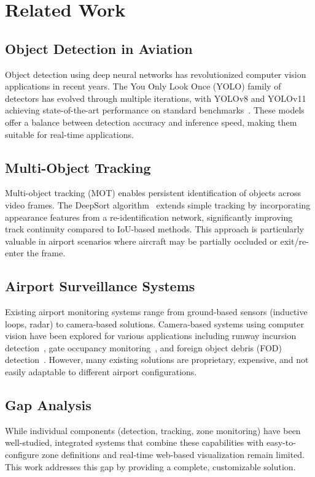 \documentclass[conference]{IEEEtran}
\begin{document}
\section{Related Work}
\label{sec:related_work}

\subsection{Object Detection in Aviation}
Object detection using deep neural networks has revolutionized computer vision applications in recent years. The You Only Look Once (YOLO) family of detectors has evolved through multiple iterations, with YOLOv8 and YOLOv11 achieving state-of-the-art performance on standard benchmarks~\cite{redmon2016yolo, ultralytics}. These models offer a balance between detection accuracy and inference speed, making them suitable for real-time applications.

\subsection{Multi-Object Tracking}
Multi-object tracking (MOT) enables persistent identification of objects across video frames. The DeepSort algorithm~\cite{wojke2017simple} extends simple tracking by incorporating appearance features from a re-identification network, significantly improving track continuity compared to IoU-based methods. This approach is particularly valuable in airport scenarios where aircraft may be partially occluded or exit/re-enter the frame.

\subsection{Airport Surveillance Systems}
Existing airport monitoring systems range from ground-based sensors (inductive loops, radar) to camera-based solutions. Camera-based systems using computer vision have been explored for various applications including runway incursion detection~\cite{zhang2017vision}, gate occupancy monitoring~\cite{kim2019automated}, and foreign object debris (FOD) detection~\cite{zhang2020foreign}. However, many existing solutions are proprietary, expensive, and not easily adaptable to different airport configurations.

\subsection{Gap Analysis}
While individual components (detection, tracking, zone monitoring) have been well-studied, integrated systems that combine these capabilities with easy-to-configure zone definitions and real-time web-based visualization remain limited. This work addresses this gap by providing a complete, customizable solution.
\end{document}
